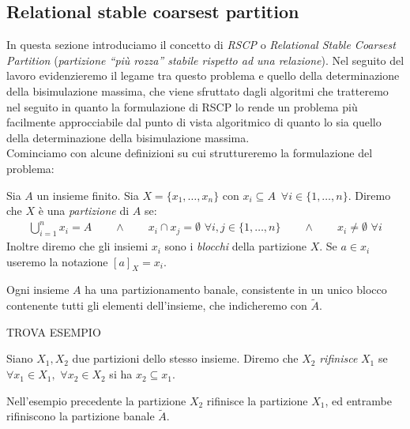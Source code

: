 \subsection{Relational stable coarsest partition}
\label{sec:rscp}
In questa sezione introduciamo il concetto di \emph{RSCP} o \emph{Relational Stable Coarsest Partition} (\emph{partizione ``più rozza'' stabile rispetto ad una relazione}).
Nel seguito del lavoro evidenzieremo il legame tra questo problema e quello della determinazione della bisimulazione massima, che viene sfruttato dagli algoritmi
che tratteremo nel seguito in quanto la formulazione di RSCP lo rende un problema più facilmente approcciabile dal punto di vista algoritmico di quanto lo sia quello della determinazione della
bisimulazione massima.\\
Cominciamo con alcune definizioni su cui struttureremo la formulazione del problema:
\begin{definition}
    Sia $A$ un insieme finito. Sia $X = \{x_1, \dots, x_n\}$ con $x_i \subseteq A \,\,\,\forall i \in \{1,\dots,n\}$. Diremo che $X$ è una \emph{partizione}
    di $A$ se:
    \begin{gather*}
        \bigcup_{i = 1}^n x_i = A \qquad \land \qquad x_i \cap x_j = \emptyset \,\,\forall i,j \in \{1,\dots,n\} \qquad \land \qquad x_i \neq \emptyset \,\,\forall i
    \end{gather*}
    Inoltre diremo che gli insiemi $x_i$ sono i \emph{blocchi} della partizione $X$. Se $a \in x_i$ useremo la notazione $[a]_X = x_i$.
\end{definition}
\begin{observation}
    \label{obs:part_banale}
    Ogni insieme $A$ ha una partizionamento banale, consistente in un unico blocco contenente tutti gli elementi dell'insieme, che indicheremo con $\widetilde{A}$.
\end{observation}
\begin{example}
    TROVA ESEMPIO
    \label{exa:set_partition}
\end{example}
\begin{definition}
    Siano $X_1,X_2$ due partizioni dello stesso insieme. Diremo che $X_2$ \emph{rifinisce} $X_1$ se $\forall x_1 \in X_1, \,\,\forall x_2 \in X_2$ si ha $x_2 \subseteq x_1$.
\end{definition}
\begin{example}
    Nell'esempio precedente la partizione $X_2$ rifinisce la partizione $X_1$, ed entrambe rifiniscono la partizione banale $\widetilde{A}$.
\end{example}
